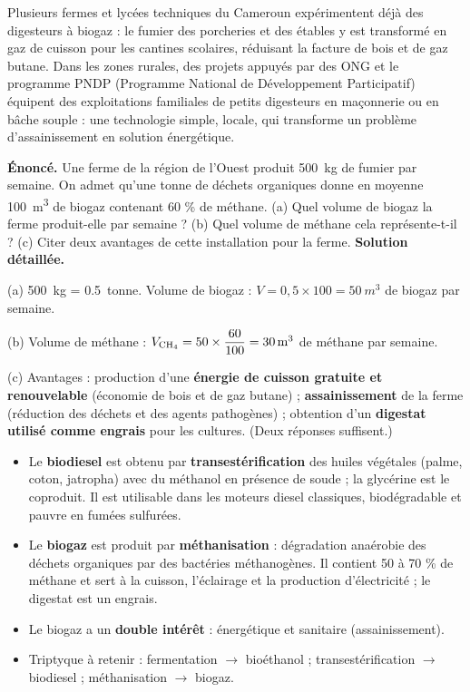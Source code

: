 \documentclass[11pt]{article}
\begin{document}
\begin{savaistu}
Plusieurs fermes et lycées techniques du Cameroun expérimentent déjà des digesteurs à biogaz : le fumier des porcheries et des étables y est transformé en gaz de cuisson pour les cantines scolaires, réduisant la facture de bois et de gaz butane. Dans les zones rurales, des projets appuyés par des ONG et le programme PNDP (Programme National de Développement Participatif) équipent des exploitations familiales de petits digesteurs en maçonnerie ou en bâche souple : une technologie simple, locale, qui transforme un problème d'assainissement en solution énergétique.
\end{savaistu}

\begin{exoresolu}
\textbf{Énoncé.} Une ferme de la région de l'Ouest produit \SI{500}{kg} de fumier par semaine. On admet qu'une tonne de déchets organiques donne en moyenne \SI{100}{m^3} de biogaz contenant 60 \% de méthane. (a) Quel volume de biogaz la ferme produit-elle par semaine ? (b) Quel volume de méthane cela représente-t-il ? (c) Citer deux avantages de cette installation pour la ferme.
\tcblower
\textbf{Solution détaillée.}\par
(a) \SI{500}{kg} = \SI{0,5}{tonne}. Volume de biogaz : $V = 0,5 \times 100 = \SI{50}{m^3}$ de biogaz par semaine.\par
(b) Volume de méthane : $V_{\ce{CH4}} = 50 \times \dfrac{60}{100} = \SI{30}{m^3}$ de méthane par semaine.\par
(c) Avantages : production d'une \textbf{énergie de cuisson gratuite et renouvelable} (économie de bois et de gaz butane) ; \textbf{assainissement} de la ferme (réduction des déchets et des agents pathogènes) ; obtention d'un \textbf{digestat utilisé comme engrais} pour les cultures. (Deux réponses suffisent.)
\end{exoresolu}

\begin{aretenir}
\begin{itemize}
\item Le \textbf{biodiesel} est obtenu par \textbf{transestérification} des huiles végétales (palme, coton, jatropha) avec du méthanol en présence de soude ; la glycérine est le coproduit. Il est utilisable dans les moteurs diesel classiques, biodégradable et pauvre en fumées sulfurées.
\item Le \textbf{biogaz} est produit par \textbf{méthanisation} : dégradation anaérobie des déchets organiques par des bactéries méthanogènes. Il contient 50 à 70 \% de méthane et sert à la cuisson, l'éclairage et la production d'électricité ; le digestat est un engrais.
\item Le biogaz a un \textbf{double intérêt} : énergétique et sanitaire (assainissement).
\item Triptyque à retenir : fermentation $\rightarrow$ bioéthanol ; transestérification $\rightarrow$ biodiesel ; méthanisation $\rightarrow$ biogaz.
\end{itemize}
\end{aretenir}
\end{document}
